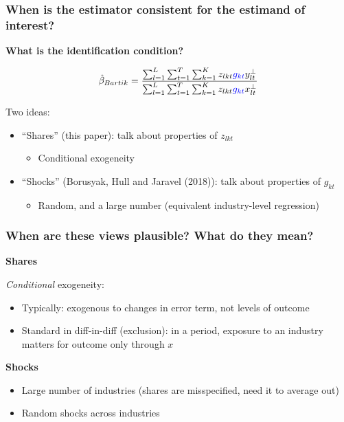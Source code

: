 \documentclass[notes,11pt, aspectratio=169]{beamer}
\begin{document}
\begin{frame}
\frametitle{When is the estimator consistent for the estimand of interest?}
\begin{center}
\textbf{What is the identification condition?}
\end{center}

$$\hat{\beta}_{Bartik}=  \frac{  \sum_{l=1}^L \sum_{t=1}^T \sum_{k=1}^K  z_{lkt} \textcolor{blue}{g_{kt}} y_{lt}^\perp    }{   \sum_{l=1}^L \sum_{t=1}^T \sum_{k=1}^K  z_{lkt} \textcolor{blue}{g_{kt}} x_{lt}^\perp   }  $$

Two ideas:
\begin{itemize}
\item ``Shares'' (this paper): talk about properties of $z_{lkt}$
	\begin{itemize}
	\item Conditional exogeneity
	\end{itemize}
\item ``Shocks'' (Borusyak, Hull and Jaravel (2018)): talk about properties of $g_{kt}$
	\begin{itemize}
	\item Random, and a large number (equivalent industry-level regression)
	\end{itemize}
\end{itemize}

\end{frame}

\begin{frame}
\frametitle{When are these views plausible? What do they mean?}


\textbf{Shares}

\textit{Conditional} exogeneity:
\begin{itemize}
\item Typically: exogenous to changes in error term, not levels of outcome
\item Standard in diff-in-diff (exclusion): in a period, exposure to an industry matters for outcome only through $x$
\end{itemize}


\textbf{Shocks}

\begin{itemize}
\item Large number of industries (shares are misspecified, need it to average out)
\item Random shocks across industries
\end{itemize}

\end{frame}
\end{document}
